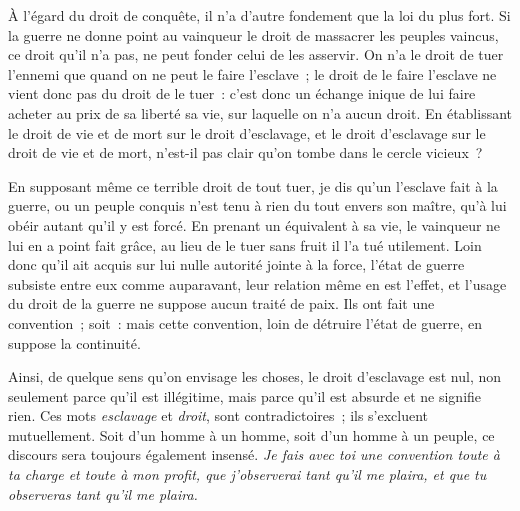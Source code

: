 \documentclass[french,twoside]{book} %
\begin{document}
À l’égard du droit de conquête, il n’a d’autre fondement que la loi du plus fort. Si la guerre ne donne point au vainqueur le droit de massacrer les peuples vaincus, ce droit qu’il n’a pas, ne peut fonder celui de les asservir. On n’a le droit de tuer l’ennemi que quand on ne peut le faire l’esclave ; le droit de le faire l’esclave ne vient donc pas du droit de le tuer : c’est donc un échange inique de lui faire acheter au prix de sa liberté sa vie, sur laquelle on n’a aucun droit. En établissant le droit de vie et de mort sur le droit d’esclavage, et le droit d’esclavage sur le droit de vie et de mort, n’est-il pas clair qu’on tombe dans le cercle vicieux ?\par
En supposant même ce terrible droit de tout tuer, je dis qu’un l’esclave fait à la guerre, ou un peuple conquis n’est tenu à rien du tout envers son maître, qu’à lui obéir autant qu’il y est forcé. En prenant un équivalent à sa vie, le vainqueur ne lui en a point fait grâce, au lieu de le tuer sans fruit il l’a tué utilement. Loin donc qu’il ait acquis sur lui nulle autorité jointe à la force, l’état de guerre subsiste entre eux comme auparavant, leur relation même en est l’effet, et l’usage du droit de la guerre ne suppose aucun traité de paix. Ils ont fait une convention ; soit : mais cette convention, loin de détruire l’état de guerre, en suppose la continuité.\par
Ainsi, de quelque sens qu’on envisage les choses, le droit d’esclavage est nul, non seulement parce qu’il est illégitime, mais parce qu’il est absurde et ne signifie rien. Ces mots {\itshape esclavage} et {\itshape droit}, sont contradictoires ; ils s’excluent mutuellement. Soit d’un homme à un homme, soit d’un homme à un peuple, ce discours sera toujours également insensé. {\itshape Je fais avec toi une convention toute à ta charge et toute à mon profit, que j’observerai tant qu’il me plaira, et que tu observeras tant qu’il me plaira.}
\end{document}
